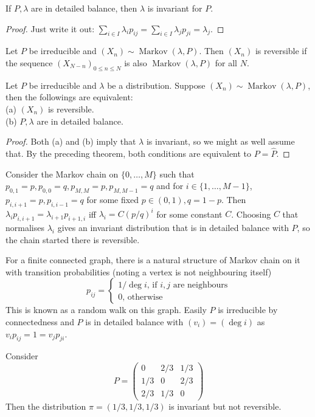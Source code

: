 \begin{lemma}
    If $P,\lambda$ are in detailed balance, then $\lambda$ is invariant for $P$.
\end{lemma}
\begin{proof}
    Just write it out: $\sum_{i\in I}\lambda_ip_{ij}=\sum_{i\in I}\lambda_jp_{ji}=\lambda_j$.
\end{proof}
\begin{definition}
    Let $P$ be irreducible and $(X_n)\sim\operatorname{Markov}(\lambda,P)$.
    Then $(X_n)$ is reversible if the sequence $(X_{N-n})_{0\le n\le N}$ is also $\operatorname{Markov}(\lambda,P)$ for all $N$.
\end{definition}
\begin{theorem}
    Let $P$ be irreducible and $\lambda$ be a distribution.
    Suppose $(X_n)\sim\operatorname{Markov}(\lambda,P)$, then the followings are equivalent:\\
    (a) $(X_n)$ is reversible.\\
    (b) $P,\lambda$ are in detailed balance.
\end{theorem}
\begin{proof}
    Both (a) and (b) imply that $\lambda$ is invariant, so we might as well assume that.
    By the preceding theorem, both conditions are equivalent to $P=\hat{P}$.
\end{proof}
\begin{example}
    Consider the Markov chain on $\{0,\ldots,M\}$ such that $p_{0,1}=p, p_{0,0}=q,p_{M,M}=p,p_{M,M-1}=q$ and for $i\in\{1,\ldots,M-1\}$, $p_{i,i+1}=p, p_{i,i-1}=q$ for some fixed $p\in (0,1),q=1-p$.
    Then $\lambda_ip_{i,i+1}=\lambda_{i+1}p_{i+1,i}$ iff $\lambda_i=C(p/q)^i$ for some constant $C$.
    Choosing $C$ that normalises $\lambda_i$ gives an invariant distribution that is in detailed balance with $P$, so the chain started there is reversible.
\end{example}
\begin{example}
    For a finite connected graph, there is a natural structure of Markov chain on it with transition probabilities (noting a vertex is not neighbouring itself)
    $$p_{ij}=\begin{cases}
        1/\deg i\text{, if $i,j$ are neighbours}\\
        0\text{, otherwise}
    \end{cases}$$
    This is known as a random walk on this graph.
    Easily $P$ is irreducible by connectedness and $P$ is in detailed balance with $(v_i)=(\deg i)$ as $v_ip_{ij}=1=v_jp_{ji}$.
\end{example}
\begin{example}
    Consider
    $$P=\begin{pmatrix}
        0&2/3&1/3\\
        1/3&0&2/3\\
        2/3&1/3&0
    \end{pmatrix}$$
    Then the distribution $\pi=(1/3,1/3,1/3)$ is invariant but not reversible.
\end{example}